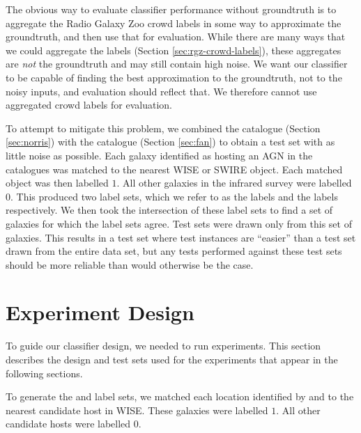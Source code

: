   The obvious way to evaluate classifier performance without groundtruth is to
  aggregate the Radio Galaxy Zoo crowd labels in some way to approximate the
  groundtruth, and then use that for evaluation. While there are many ways that
  we could aggregate the labels (Section \ref{sec:rgz-crowd-labels}), these
  aggregates are \emph{not} the groundtruth and may still contain high noise. We
  want our classifier to be capable of finding the best approximation to the
  groundtruth, not to the noisy inputs, and evaluation should reflect that. We
  therefore cannot use aggregated crowd labels for evaluation.

  To attempt to mitigate this problem, we combined the \citeauthor{norris06}
  catalogue (Section \ref{sec:norris}) with the \citeauthor{fan15} catalogue
  (Section \ref{sec:fan}) to obtain a test set with as little noise as possible.
  Each galaxy identified as hosting an AGN in the catalogues was matched to the
  nearest WISE or SWIRE object. Each matched object was then labelled $1$. All
  other galaxies in the infrared survey were labelled $0$. This produced two
  label sets, which we refer to as the \citeauthor{norris06} labels and the
  \citeauthor{fan15} labels respectively. We then took the intersection of these
  label sets to find a set of galaxies for which the label sets agree. Test sets
  were drawn only from this set of galaxies. This results in a test set where
  test instances are ``easier'' than a test set drawn from the entire data set,
  but any tests performed against these test sets should be more reliable than
  would otherwise be the case.

\section{Experiment Design}
\label{sec:experiment-design}

  To guide our classifier design, we needed to run experiments. This section
  describes the design and test sets used for the experiments that appear in the
  following sections.

  To generate the \citeauthor{norris06} and \citeauthor{fan15} label sets, we
  matched each location identified by \citeauthor{norris06} and
  \citeauthor{fan15} to the nearest candidate host in WISE. These galaxies were
  labelled $1$. All other candidate hosts were labelled $0$.

